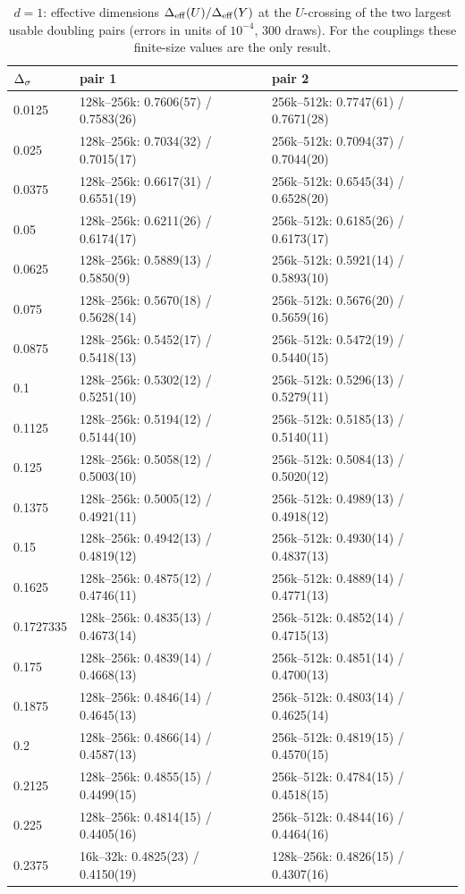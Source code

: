 \begin{table}[htbp]\centering\scriptsize
\caption{$d=1$: effective dimensions $\Delta_{\rm eff}(U)/\Delta_{\rm eff}(Y)$ at the $U$-crossing of the two largest usable doubling pairs (errors in units of
$10^{-4}$, 300 draws). For the  couplings these finite-size values are the only result.}\label{mc:tab:1dpairs}
\begin{tabular}{@{}lll@{}}\toprule
$\Delta_\sigma$ & pair 1 & pair 2 \\\midrule
0.0125 & 128k--256k: 0.7606(57) / 0.7583(26) & 256k--512k: 0.7747(61) / 0.7671(28) \\
0.025 & 128k--256k: 0.7034(32) / 0.7015(17) & 256k--512k: 0.7094(37) / 0.7044(20) \\
0.0375 & 128k--256k: 0.6617(31) / 0.6551(19) & 256k--512k: 0.6545(34) / 0.6528(20) \\
0.05 & 128k--256k: 0.6211(26) / 0.6174(17) & 256k--512k: 0.6185(26) / 0.6173(17) \\
0.0625 & 128k--256k: 0.5889(13) / 0.5850(9) & 256k--512k: 0.5921(14) / 0.5893(10) \\
0.075 & 128k--256k: 0.5670(18) / 0.5628(14) & 256k--512k: 0.5676(20) / 0.5659(16) \\
0.0875 & 128k--256k: 0.5452(17) / 0.5418(13) & 256k--512k: 0.5472(19) / 0.5440(15) \\
0.1 & 128k--256k: 0.5302(12) / 0.5251(10) & 256k--512k: 0.5296(13) / 0.5279(11) \\
0.1125 & 128k--256k: 0.5194(12) / 0.5144(10) & 256k--512k: 0.5185(13) / 0.5140(11) \\
0.125 & 128k--256k: 0.5058(12) / 0.5003(10) & 256k--512k: 0.5084(13) / 0.5020(12) \\
0.1375 & 128k--256k: 0.5005(12) / 0.4921(11) & 256k--512k: 0.4989(13) / 0.4918(12) \\
0.15 & 128k--256k: 0.4942(13) / 0.4819(12) & 256k--512k: 0.4930(14) / 0.4837(13) \\
0.1625 & 128k--256k: 0.4875(12) / 0.4746(11) & 256k--512k: 0.4889(14) / 0.4771(13) \\
0.1727335 & 128k--256k: 0.4835(13) / 0.4673(14) & 256k--512k: 0.4852(14) / 0.4715(13) \\
0.175 & 128k--256k: 0.4839(14) / 0.4668(13) & 256k--512k: 0.4851(14) / 0.4700(13) \\
0.1875 & 128k--256k: 0.4846(14) / 0.4645(13) & 256k--512k: 0.4803(14) / 0.4625(14) \\
0.2 & 128k--256k: 0.4866(14) / 0.4587(13) & 256k--512k: 0.4819(15) / 0.4570(15) \\
0.2125 & 128k--256k: 0.4855(15) / 0.4499(15) & 256k--512k: 0.4784(15) / 0.4518(15) \\
0.225 & 128k--256k: 0.4814(15) / 0.4405(16) & 256k--512k: 0.4844(16) / 0.4464(16) \\
0.2375 & 16k--32k: 0.4825(23) / 0.4150(19) & 128k--256k: 0.4826(15) / 0.4307(16) \\
\bottomrule\end{tabular}
\end{table}


